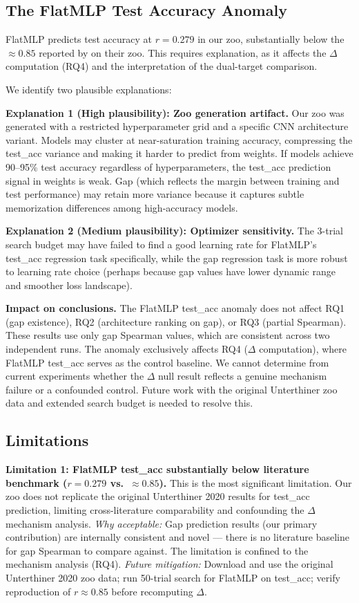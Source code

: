\subsection{The FlatMLP Test Accuracy Anomaly}

FlatMLP predicts test accuracy at $r = 0.279$ in our zoo, substantially below the $\approx 0.85$ reported by
\citet{unterthiner2020} on their zoo. This requires explanation, as it affects the $\Delta$ computation
(RQ4) and the interpretation of the dual-target comparison.

We identify two plausible explanations:

\textbf{Explanation 1 (High plausibility): Zoo generation artifact.} Our zoo was generated with a restricted
hyperparameter grid and a specific CNN architecture variant. Models may cluster at near-saturation
training accuracy, compressing the test\_acc variance and making it harder to predict from weights.
If models achieve 90--95\% test accuracy regardless of hyperparameters, the test\_acc prediction signal
in weights is weak. Gap (which reflects the margin between training and test performance) may retain
more variance because it captures subtle memorization differences among high-accuracy models.

\textbf{Explanation 2 (Medium plausibility): Optimizer sensitivity.} The 3-trial search budget may have
failed to find a good learning rate for FlatMLP's test\_acc regression task specifically, while the
gap regression task is more robust to learning rate choice (perhaps because gap values have lower
dynamic range and smoother loss landscape).

\textbf{Impact on conclusions.} The FlatMLP test\_acc anomaly does not affect RQ1 (gap existence), RQ2
(architecture ranking on gap), or RQ3 (partial Spearman). These results use only gap Spearman values,
which are consistent across two independent runs. The anomaly exclusively affects RQ4 ($\Delta$ computation),
where FlatMLP test\_acc serves as the control baseline. We cannot determine from current experiments
whether the $\Delta$ null result reflects a genuine mechanism failure or a confounded control. Future work
with the original Unterthiner zoo data and extended search budget is needed to resolve this.

\subsection{Limitations}

\textbf{Limitation 1: FlatMLP test\_acc substantially below literature benchmark ($r = 0.279$ vs.\ $\approx 0.85$).}
This is the most significant limitation. Our zoo does not replicate the original Unterthiner 2020
results for test\_acc prediction, limiting cross-literature comparability and confounding the $\Delta$
mechanism analysis.
\textit{Why acceptable:} Gap prediction results (our primary contribution) are internally consistent and
novel --- there is no literature baseline for gap Spearman to compare against. The limitation is
confined to the mechanism analysis (RQ4).
\textit{Future mitigation:} Download and use the original Unterthiner 2020 zoo data; run 50-trial search
for FlatMLP on test\_acc; verify reproduction of $r \approx 0.85$ before recomputing $\Delta$.

